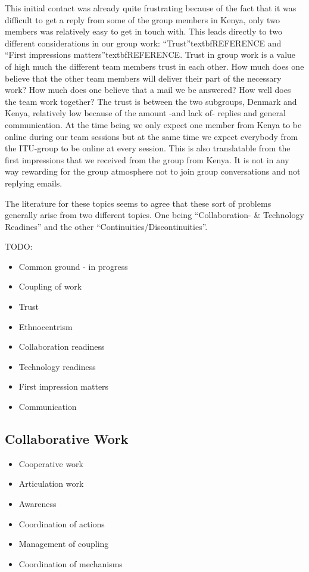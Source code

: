 This initial contact was already quite frustrating because of the fact that it was difficult to get a reply from some of the group members in Kenya, only two members was relatively easy to get in touch with. This leads directly to two different considerations in our group work: ``Trust''textbf{REFERENCE} and ``First impressions matters''textbf{REFERENCE}. Trust in group work is a value of high much the different team members trust in each other. How much does one believe that the other team members will deliver their part of the necessary work? How much does one believe that a mail we be answered? How well does the team work together? The trust is between the two subgroups, Denmark and Kenya, relatively low because of the amount -and lack of- replies and general communication. At the time being we only expect one member from Kenya to be online during our team sessions but at the same time we expect everybody from the ITU-group to be online at every session. This is also translatable from the first impressions that we received from the group from Kenya. It is not in any way rewarding for the group atmosphere not to join group conversations and not replying emails. 

The literature for these topics seems to agree that these sort of problems generally arise from two different topics. One being ``Collaboration- & Technology Readines'' and the other ``Continuities/Discontinuities''. 


TODO:
\begin{itemize}
  \item Common ground - in progress
  \item Coupling of work
  \item Trust
	\item Ethnocentrism
	\item Collaboration readiness
	\item Technology readiness
	\item First impression matters
	\item Communication
\end{itemize}

\subsection{Collaborative Work}
\begin{itemize}
  \item Cooperative work
  \item Articulation work
  \item Awareness
	\item Coordination of actions
	\item Management of coupling
	\item Coordination of mechanisms
\end{itemize}


